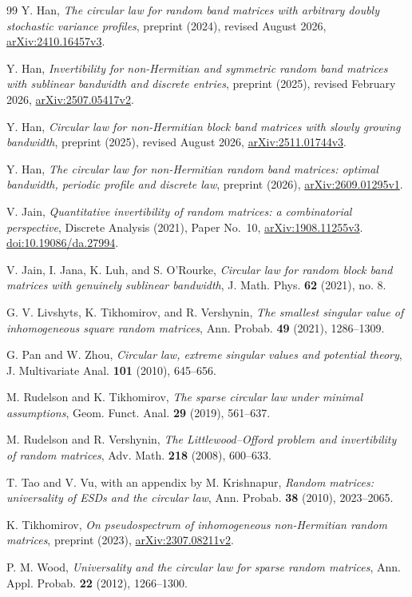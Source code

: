\documentclass[11pt,reqno]{amsart}
\numberwithin{equation}{section}
\theoremstyle{plain}
\theoremstyle{definition}
\theoremstyle{remark}
\begin{document}
\begin{thebibliography}{99}
Y. Han, \emph{The circular law for random band matrices with
arbitrary doubly stochastic variance profiles}, preprint (2024),
revised August 2026,
\href{https://arxiv.org/abs/2410.16457v3}{arXiv:2410.16457v3}.

Y. Han, \emph{Invertibility for non-Hermitian and symmetric random band
matrices with sublinear bandwidth and discrete entries}, preprint (2025),
revised February 2026,
\href{https://arxiv.org/abs/2507.05417v2}{arXiv:2507.05417v2}.

Y. Han, \emph{Circular law for non-Hermitian block band matrices with slowly
growing bandwidth}, preprint (2025), revised August 2026,
\href{https://arxiv.org/abs/2511.01744v3}{arXiv:2511.01744v3}.

Y. Han, \emph{The circular law for non-Hermitian random band matrices:
optimal bandwidth, periodic profile and discrete law}, preprint (2026),
\href{https://arxiv.org/abs/2609.01295v1}{arXiv:2609.01295v1}.

V. Jain, \emph{Quantitative invertibility of random matrices: a
combinatorial perspective}, Discrete Analysis (2021), Paper No.~10,
\href{https://arxiv.org/abs/1908.11255v3}{arXiv:1908.11255v3}.
\href{https://doi.org/10.19086/da.27994}{doi:10.19086/da.27994}.

V. Jain, I. Jana, K. Luh, and S. O'Rourke,
\emph{Circular law for random block band matrices with genuinely
sublinear bandwidth}, J. Math. Phys. \textbf{62} (2021), no. 8.

G. V. Livshyts, K. Tikhomirov, and R. Vershynin,
\emph{The smallest singular value of inhomogeneous square random matrices},
Ann. Probab. \textbf{49} (2021), 1286--1309.

G. Pan and W. Zhou,
\emph{Circular law, extreme singular values and potential theory},
J. Multivariate Anal. \textbf{101} (2010), 645--656.

M. Rudelson and K. Tikhomirov,
\emph{The sparse circular law under minimal assumptions},
Geom. Funct. Anal. \textbf{29} (2019), 561--637.

M. Rudelson and R. Vershynin,
\emph{The Littlewood--Offord problem and invertibility of random matrices},
Adv. Math. \textbf{218} (2008), 600--633.

T. Tao and V. Vu, with an appendix by M. Krishnapur,
\emph{Random matrices: universality of ESDs and the circular law},
Ann. Probab. \textbf{38} (2010), 2023--2065.

K. Tikhomirov,
\emph{On pseudospectrum of inhomogeneous non-Hermitian random matrices},
preprint (2023),
\href{https://arxiv.org/abs/2307.08211v2}{arXiv:2307.08211v2}.

P. M. Wood,
\emph{Universality and the circular law for sparse random matrices},
Ann. Appl. Probab. \textbf{22} (2012), 1266--1300.
\end{thebibliography}

\end{document}
